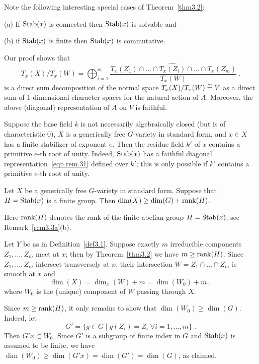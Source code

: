 \begin{remark} \label{rem3.3a}
Note the following interesting special cases of Theorem~\ref{thm3.2}:

\smallskip
(a) If $\operatorname{Stab}(x)$ is connected then $\operatorname{Stab}(x)$ is solvable and

\smallskip
(b) if $\operatorname{Stab}(x)$ is finite then $\operatorname{Stab}(x)$ is commutative.
\end{remark}

\begin{remark} \label{rem3.3b}
Our proof shows that 
\begin{equation} \label{eqn.rem.31}
T_x(X)/T_x(W)=\bigoplus_{i=1}^m
\frac{T_x(Z_1)\cap\dots\cap\widehat{T_x(Z_i)}\cap\dots\cap T_x(Z_m)}{T_x(W)}\ .
\end{equation}
is a direct sum decomposition of the normal space
$T_x(X)/T_x(W)\overset{\sim}{=} V$ as a direct sum of 1-dimensional character spaces
for the natural action of $A$. Moreover, the above (diagonal)
representation of $A$ on $V$ is faithful.
\end{remark}

\begin{remark} \label{rem3.3c}
Suppose the base field $k$ is not necessarily algebraically closed
(but is of characteristic 0),
$X$ is a generically free $G$-variety in standard form,
and $x \in X$
has a finite stabilizer of exponent $e$. Then the residue field $k'$ of $x$
contains a primitive $e$-th
root of unity. Indeed, $\operatorname{Stab}(x)$ has a faithful diagonal 
representation~\eqref{eqn.rem.31} defined over $k'$; this is only possible
if $k'$ contains a primitive $e$-th root of unity.
\end{remark}

\begin{cor} \label{cor3.3}
Let $X$ be a generically free $G$-variety 
in standard form.  Suppose that $H= \operatorname{Stab}(x)$ is a finite group.
Then $\dim(X) \geq \dim(G) + \operatorname{rank}(H)$.
\end{cor}

Here $\operatorname{rank}(H)$ denotes the rank of the finite abelian group
$H= \operatorname{Stab}(x)$; see Remark~\ref{rem3.3a}(b).

\begin{pf}
Let $Y$ be as in Definition~\ref{def3.1}. Suppose
exactly $m$ irreducible components $Z_1, \dots, Z_m$ meet at $x$; then by
Theorem~\ref{thm3.2} we have $m \geq \operatorname{rank}(H)$.
Since $Z_1, \ldots, Z_m$ intersect transversely at $x$, their intersection
$W = Z_1 \cap \dots \cap Z_m$ is smooth at $x$ and
\[
 \dim(X) = \dim_x(W) + m = \dim(W_0) + m \; ,
\]
where $W_0$ is the (unique) component of $W$ passing through $X$. 

Since $m \geq \operatorname{rank}(H)$,
it only remains to show that $\dim(W_0) \geq \dim(G)$. Indeed, let
\[
G' = \{ g \in G \mid g(Z_i) = Z_i  \; \forall i = 1, \dots, m \} \; .
\] 
Then $G'x \subset W_0$. Since $G'$ is a subgroup of finite index in $G$
and $\operatorname{Stab}(x)$ is assumed to be finite, 
we have $\dim(W_0) \geq \dim(G'x) = \dim(G') = \dim(G)$,
as claimed.
\end{pf}

